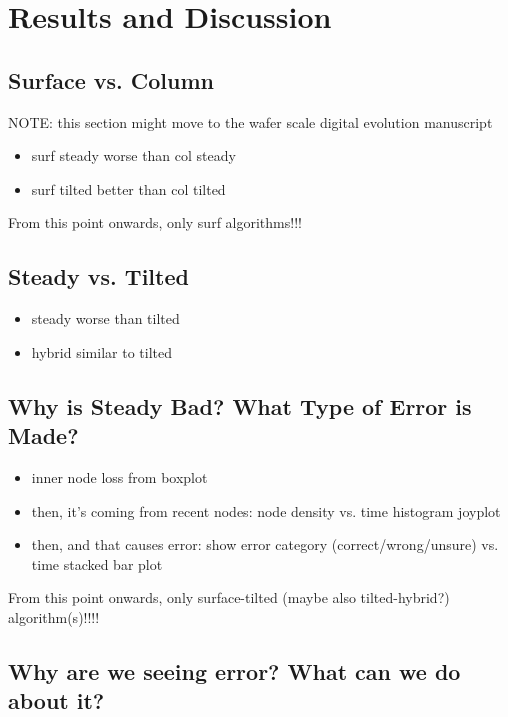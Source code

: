 \section{Results and Discussion} \label{sec:results}



\subsection{Surface vs. Column} \label{sec:surface-vs-column}
NOTE: this section might move to the wafer scale digital evolution manuscript

\begin{itemize}
    \item surf steady worse than col steady
    \item surf tilted better than col tilted
\end{itemize}

From this point onwards, only surf algorithms!!!

\subsection{Steady vs. Tilted} \label{sec:steady-vs-tilted}
\begin{itemize}
    \item steady worse than tilted
    \item hybrid similar to tilted
\end{itemize}



\subsection{Why is Steady Bad? What Type of Error is Made?} \label{sec:error-analysis}
\begin{itemize}
    \item inner node loss from boxplot
    \item then, it's coming from recent nodes: node density vs. time histogram joyplot
    \item then, and that causes error: show error category (correct/wrong/unsure) vs. time stacked bar plot
\end{itemize}

From this point onwards, only surface-tilted (maybe also tilted-hybrid?) algorithm(s)!!!!

\subsection{Why are we seeing error? What can we do about it?} \label{sec:error-uncertainty}

